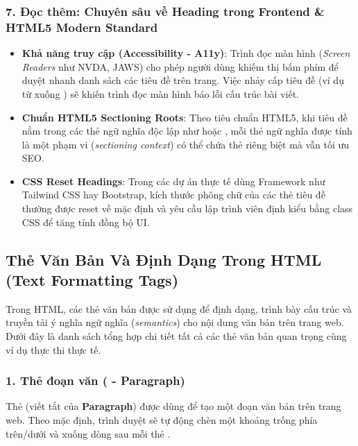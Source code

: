 \subsubsection{7. Đọc thêm: Chuyên sâu về Heading trong Frontend \& HTML5 Modern Standard}

\begin{conceptBox}
\begin{itemize}[leftmargin=1.5em, itemsep=3pt, parsep=0pt]
    \item \textbf{Khả năng truy cập (Accessibility - A11y)}: Trình đọc màn hình (\textit{Screen Readers} như NVDA, JAWS) cho phép người dùng khiếm thị bấm phím  để duyệt nhanh danh sách các tiêu đề trên trang. Việc nhảy cấp tiêu đề (ví dụ từ  xuống ) sẽ khiến trình đọc màn hình báo lỗi cấu trúc bài viết.
    \item \textbf{Chuẩn HTML5 Sectioning Roots}: Theo tiêu chuẩn HTML5, khi tiêu đề nằm trong các thẻ ngữ nghĩa độc lập như  hoặc , mỗi thẻ ngữ nghĩa được tính là một phạm vi (\textit{sectioning context}) có thể chứa thẻ  riêng biệt mà vẫn tối ưu SEO.
    \item \textbf{CSS Reset Headings}: Trong các dự án thực tế dùng Framework như Tailwind CSS hay Bootstrap, kích thước phông chữ của các thẻ tiêu đề thường được reset về mặc định và yêu cầu lập trình viên định kiểu bằng class CSS để tăng tính đồng bộ UI.
\end{itemize}
\end{conceptBox}

\subsection{Thẻ Văn Bản Và Định Dạng Trong HTML (Text Formatting Tags)}
\label{subsec:text_formatting_tags}

Trong HTML, các thẻ văn bản được sử dụng để định dạng, trình bày cấu trúc và truyền tải ý nghĩa ngữ nghĩa (\textit{semantics}) cho nội dung văn bản trên trang web. Dưới đây là danh sách tổng hợp chi tiết tất cả các thẻ văn bản quan trọng cùng ví dụ thực thi thực tế.

\subsubsection{1. Thẻ đoạn văn ( - Paragraph)}

Thẻ  (viết tắt của \textbf{Paragraph}) được dùng để tạo một đoạn văn bản trên trang web. Theo mặc định, trình duyệt sẽ tự động chèn một khoảng trống phía trên/dưới và xuống dòng sau mỗi thẻ .

